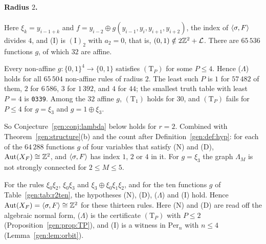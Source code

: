 \paragraph{Radius $2$.} Here $\xi_k=y_{i-1+k}$ and $f=y_{i-2}\oplus g(y_{i-1},y_i,y_{i+1},y_{i+2})$, the index of $\langle\sigma,F\rangle$ divides $4$, and \textup{(I)} is $(\mathrm I)_2$ with $a_2=0$, that is, $(0,1)\notin2\mathbb{Z}^2+\mathcal L$. There are $65\,536$ functions $g$, of which $32$ are affine.

\begin{proposition}\label{gen:prop:r2TP}
Every non-affine $g\colon\{0,1\}^4\to\{0,1\}$ satisfies $(\mathrm T_P)$ for some $P\le4$. Hence \textup{($\Lambda$)} holds for all $65\,504$ non-affine rules of radius $2$. The least such $P$ is $1$ for $57\,482$ of them, $2$ for $6\,586$, $3$ for $1\,392$, and $4$ for $44$; the smallest truth table with least $P=4$ is \textup{\texttt{0339}}. Among the $32$ affine $g$, $(\mathrm T_1)$ holds for $30$, and $(\mathrm T_P)$ fails for $P\le4$ for $g=\xi_3$ and $g=1\oplus\xi_3$.
\end{proposition}

So Conjecture~\ref{gen:conj:lambda} below holds for $r=2$. Combined with Theorem~\ref{gen:structure}(b) and the count after Definition~\ref{gen:def:hyp}: for each of the $64\,288$ functions $g$ of four variables that satisfy \textup{(N)} and \textup{(D)}, $\operatorname{Aut}(X_F)\cong\mathbb{Z}^2$, and $\langle\sigma,F\rangle$ has index $1$, $2$ or $4$ in it. For $g=\xi_3$ the graph $\Lambda_M$ is not strongly connected for $2\le M\le5$.

\begin{proposition}\label{gen:prop:r2}
For the rules $\xi_0\xi_2$, $\xi_0\xi_3$ and $\xi_3\oplus\xi_0\xi_1\xi_2$, and for the ten functions $g$ of Table~\ref{gen:tab:r2ten}, the hypotheses \textup{(N)}, \textup{(D)}, \textup{($\Lambda$)} and \textup{(I)} hold. Hence $\operatorname{Aut}(X_F)=\langle\sigma,F\rangle\cong\mathbb{Z}^2$ for these thirteen rules. Here \textup{(N)} and \textup{(D)} are read off the algebraic normal form, \textup{($\Lambda$)} is the certificate $(\mathrm T_P)$ with $P\le2$ (Proposition~\ref{gen:prop:TP}), and \textup{(I)} is a witness in $\mathrm{Per}_n$ with $n\le4$ (Lemma~\ref{gen:lem:orbit}).
\end{proposition}

